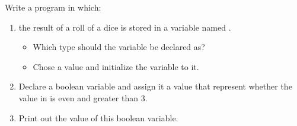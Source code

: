 Write a program in which:

\begin{enumerate}
  \item the result of a roll of a dice is stored in a variable named .
    \begin{itemize}
      \item Which type should the variable be declared as?
      \item Chose a value and initialize the variable to it.
    \end{itemize}
  \item Declare a boolean variable and assign it a value that represent whether the value in  is even and greater than 3.
  \item Print out the value of this boolean variable.
\end{enumerate}
